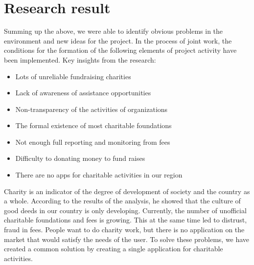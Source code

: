 \section{Research result}
Summing up the above, we were able to identify obvious problems in the environment and new ideas for the project. In the process of joint work, the conditions for the formation of the following elements of project activity have been implemented. Key insights from the research:

\begin{itemize}
    \item Lots of unreliable fundraising charities
    \item Lack of awareness of assistance opportunities
    \item Non-transparency of the activities of organizations
    \item The formal existence of most charitable foundations
    \item Not enough full reporting and monitoring from fees
    \item Difficulty to donating money to fund raises 
    \item There are no apps for charitable activities in our region
\end{itemize}

Charity is an indicator of the degree of development of society and the country as a whole. According to the results of the analysis, he showed that the culture of good deeds in our country is only developing. Currently, the number of unofficial charitable foundations and fees is growing. This at the same time led to distrust, fraud in fees. People want to do charity work, but there is no application on the market that would satisfy the needs of the user. To solve these problems, we have created a common solution by creating a single application for charitable activities.